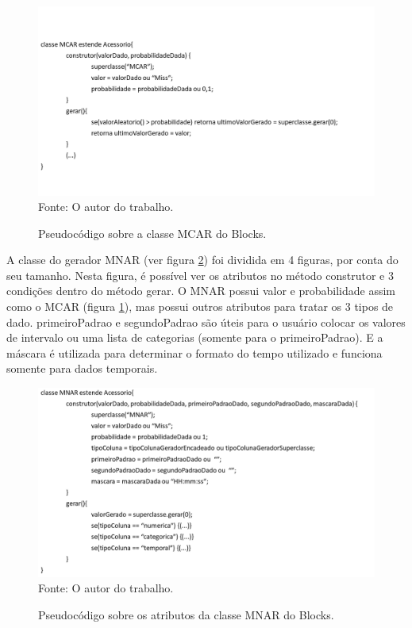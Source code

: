 \documentclass[
	12pt,				%
	openright,			%
	oneside,			%
	a4paper,			%
	english,			%
	brazil				%
	]{abntex2}
\begin{document}
		\begin{figure}[h!]
			\centering
			\caption{Pseudocódigo sobre a classe MCAR do Blocks.}
			\includegraphics[width=\linewidth]{./figures/prototipo/MCAR.png}
			\label{fig:classeMCAR}
			\footnotesize Fonte: O autor do trabalho.
		\end{figure}
		\par
		\pagebreak
		A classe do gerador MNAR (ver figura \ref{fig:MNARConstrutor}) foi dividida em 4 figuras, por conta do seu tamanho.
		Nesta figura, é possível ver os atributos no método construtor e 3 condições dentro do método gerar.
		O MNAR possui valor e probabilidade assim como o MCAR (figura \ref{fig:classeMCAR}), mas possui outros atributos para tratar os 3 tipos de dado.
		primeiroPadrao e segundoPadrao são úteis para o usuário colocar os valores de intervalo ou uma lista de categorias (somente para o primeiroPadrao).
		E a máscara é utilizada para determinar o formato do tempo utilizado e funciona somente para dados temporais.   
		\begin{figure}[h!]
			\centering
			\caption{Pseudocódigo sobre os atributos da classe MNAR do Blocks.}
			\includegraphics[width=\linewidth]{./figures/prototipo/MNARConstrutor.png}
			\label{fig:MNARConstrutor}
			\footnotesize Fonte: O autor do trabalho.
		\end{figure}
\end{document}
